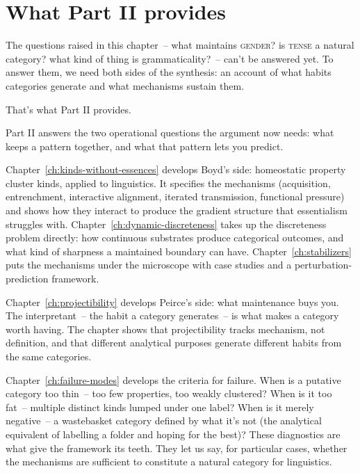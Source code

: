 \section{What Part II provides}
\label{sec:3:what-part-ii-provides}

The questions raised in this chapter~-- what maintains \textsc{gender}? is \textsc{tense} a natural category? what kind of thing is grammaticality?~-- can't be answered yet. To answer them, we need both sides of the synthesis: an account of what habits categories generate and what mechanisms sustain them.

That's what Part II provides.

Part II answers the two operational questions the argument now needs: what keeps a pattern together, and what that pattern lets you predict.

Chapter~\ref{ch:kinds-without-essences} develops Boyd's side: homeostatic property cluster kinds, applied to linguistics. It specifies the mechanisms (acquisition, entrenchment, interactive alignment, iterated transmission, functional pressure) and shows how they interact to produce the gradient structure that essentialism struggles with. Chapter~\ref{ch:dynamic-discreteness} takes up the discreteness problem directly: how continuous substrates produce categorical outcomes, and what kind of sharpness a maintained boundary can have. Chapter~\ref{ch:stabilizers} puts the mechanisms under the microscope with case studies and a perturbation-prediction framework.

Chapter~\ref{ch:projectibility} develops Peirce's side: what maintenance buys you. The interpretant~-- the habit a category generates~-- is what makes a category worth having. The chapter shows that projectibility tracks mechanism, not definition, and that different analytical purposes generate different habits from the same categories.

Chapter~\ref{ch:failure-modes} develops the criteria for failure. When is a putative category too thin~-- too few properties, too weakly clustered? When is it too fat~-- multiple distinct kinds lumped under one label? When is it merely negative~-- a wastebasket category defined by what it's not (the analytical equivalent of labelling a folder  and hoping for the best)? These diagnostics are what give the framework its teeth. They let us say, for particular cases, whether the mechanisms are sufficient to constitute a natural category for linguistics.

